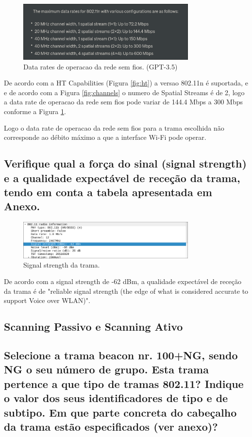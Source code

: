 \documentclass{article}
\begin{document}
\begin{figure}[h]
    \centering
    \includegraphics[width=0.8\textwidth]{images/chat.png}
    \caption{\label{fig:chat}Data rates de operacao da rede sem fios. (GPT-3.5)}
\end{figure}

De acordo com a HT Capabilities (Figura \ref{fig:ht}) a versao 802.11n é suportada, e
e de acordo com a Figura \ref{fig:channels} o numero de Spatial Streams é de 2, logo a data rate de operacao da rede sem fios pode variar de 144.4 Mbps a 300 Mbps conforme a Figura \ref{fig:chat}.

Logo o data rate de operacao da rede sem fios para a trama escolhida não corresponde ao débito máximo a que a interface Wi-Fi pode operar.

\subsection{Verifique qual a força do sinal (signal strength) e a qualidade expectável de  receção da trama, tendo em conta a tabela apresentada em Anexo.}

\begin{figure}[h]
    \centering
    \includegraphics[width=0.8\textwidth]{images/signal.png}
    \caption{\label{fig:signal}Signal strength da trama.}
\end{figure}

De acordo com a signal strength de -62 dBm, a qualidade expectável de receção da trama é de "reliable signal strength (the edge of what is considered accurate to support Voice over WLAN)".

\subsection*{Scanning Passivo e Scanning Ativo}
\subsection{Selecione a trama beacon nr. 100+NG, sendo NG o seu número de grupo. Esta  trama pertence a que tipo de tramas 802.11? Indique o valor dos seus  identificadores de tipo e de subtipo. Em que parte concreta do cabeçalho da  trama estão especificados (ver anexo)?}
\end{document}
